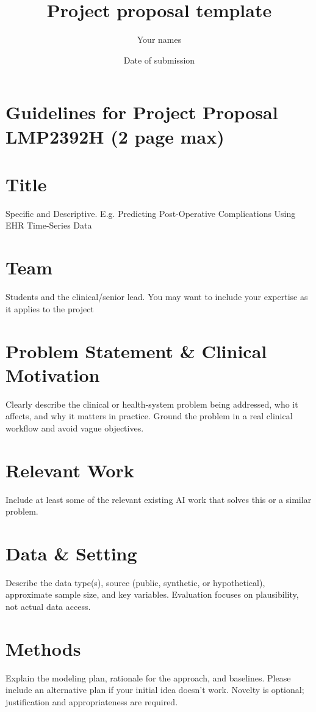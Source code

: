 \documentclass{article}
\title{Project proposal template}
\author{Your names}
\date{Date of submission}
\begin{document}
\maketitle

\section*{Guidelines for Project Proposal LMP2392H (2 page max)}

\section{Title}
Specific and Descriptive. E.g. Predicting Post-Operative Complications Using EHR Time-Series Data

\section{Team}
Students and the clinical/senior lead. You may want to include your expertise as it applies to the project

\section{Problem Statement \& Clinical Motivation}
Clearly describe the clinical or health-system problem being addressed, who it affects, and why it
matters in practice. Ground the problem in a real clinical workflow and avoid vague objectives.

\section{Relevant Work}
Include at least some of the relevant existing AI work that solves this or a similar problem. 

\section{Data \& Setting}
Describe the data type(s), source (public, synthetic, or hypothetical), approximate sample size, and key
variables. Evaluation focuses on plausibility, not actual data access.

\section{Methods}
Explain the modeling plan, rationale for the approach, and baselines. Please include an alternative plan if your initial idea doesn’t work. Novelty is optional; justification and appropriateness are required. 
\end{document}
